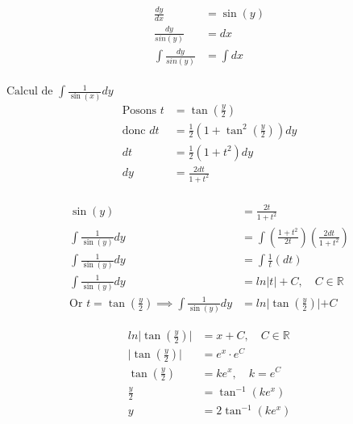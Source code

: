 \begin{align*}
	\frac{dy}{dx} &= \sin(y) \\
	\frac{dy}{sin(y)} &= dx \\
	\int \frac {dy}{sin(y)} &= \int dx \\
\end{align*}

$\text{Calcul de } \int \frac{1}{\sin(x)} dy$ \\
\begin{align*}
\text{Posons } t &= \tan(\frac{y}{2}) \\
\text{donc } dt &= \frac{1}{2}(1 + \tan^2(\frac{y}{2}))dy \\
dt &= \frac{1}{2}(1 + t^2)dy \\ dy &= \frac{2dt}{1+t^2} \\	
\end{align*}


\begin{align*}
	\sin(y) &= \frac{2t}{1 + t^2} \\
	\int \frac{1}{\sin(y)} dy &= \int (\frac{1+t^2}{2t}) (\frac{2dt}{1+t^2}) \\
	\int \frac{1}{\sin(y)} dy &= \int \frac{1}{t} ({dt}) \\
	\int \frac{1}{\sin(y)} dy &= ln|t| + C, \quad C \in \mathbb{R} \\
	\text{Or } t = \tan(\frac{y}{2}) \implies \int \frac{1}{\sin(y)} dy &= ln \lvert \tan(\frac{y}{2}) \lvert + C
\end{align*}

\begin{align*}
	ln \lvert \tan(\frac{y}{2}) \lvert &= x + C, \quad C \in \mathbb{R} \\
	\lvert \tan(\frac{y}{2}) \lvert &= e^x \cdot e^C \\
	\tan(\frac{y}{2}) &= ke^x, \quad k = e^C\\
	 \frac{y}{2} &= \tan^{-1} (ke^x) \\
	 y &= 2 \tan^{-1} (ke^x) \\
\end{align*}

